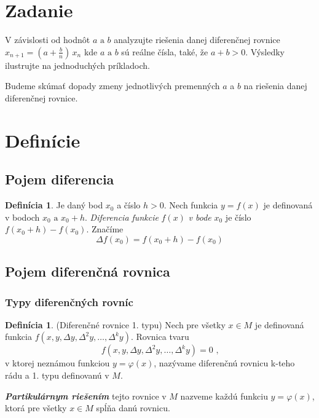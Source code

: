 \documentclass[a4paper,10pt]{article}
\theoremstyle{plain}
\theoremstyle{definition}
\newtheorem{defin}[thm]{Definícia}
\begin{document}
\newpage

\tableofcontents



\newpage
\section{Zadanie}

V závislosti od hodnôt $ a \text{ a } b $
analyzujte riešenia danej diferenčnej rovnice
$x_{n+1}=\left(a+{\frac{b}{n}}\right)\,x_{n}$
kde $ a \text{ a } b $ sú reálne čísla, také, že $ a + b > 0$. Výsledky ilustrujte na jednoduchých príkladoch. 

Budeme skúmať dopady zmeny jednotlivých premenných $a$ a $b$ na riešenia danej diferenčnej rovnice.

\section{Definície}
\subsection{Pojem diferencia}

\begin{defin}
Je daný bod $x_{0}$ a číslo $h > 0$. Nech funkcia $y = f(x)$ je 
definovaná v bodoch $x_{0} \text{ a } x_{0} + h$. \textit{Diferencia funkcie }$f(x)$\textit{ v bode }$x_{0}$
je číslo $f(x_{0} + h) - f(x_{0})$. Značíme
$$\Delta f(x_{0}) = f(x_{0} + h) - f(x_{0})$$
\end{defin}
\subsection{Pojem diferenčná rovnica}
\subsubsection{Typy diferenčných rovníc}

\begin{defin}
(Diferenčné rovnice 1. typu) 
Nech pre všetky $x \in M$ je
definovaná funkcia $f(x, y, \Delta y, \Delta ^{2}y, \ldots, \Delta ^{k}y)$. Rovnica tvaru
$$f(x, y, \Delta y, \Delta ^{2}y, \ldots, \Delta ^{k}y) = 0 \text{ ,}$$
v ktorej neznámou funkciou $y = \varphi(x)$, nazývame diferenčnú rovnicu k-teho 
rádu a 1. typu definovanú v $M$.
\end{defin}

\textbf{\textit{Partikulárnym riešením}} tejto rovnice v $M$ nazveme každú funkciu
$y = \varphi(x)$, ktorá pre všetky $x \in M$ spĺňa danú rovnicu.
\end{document}
